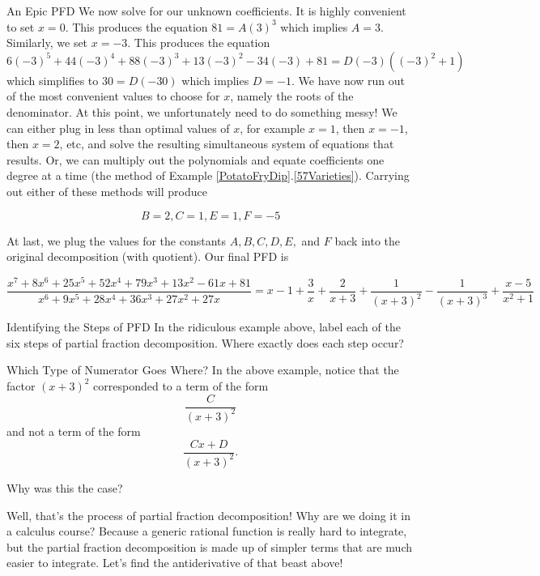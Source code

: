 \begin{example}{An Epic PFD}
We now solve for our unknown coefficients.  It is highly convenient to set $x=0$. This produces the equation $ 81= A (3)^3 $ which implies $A=3$.  Similarly, we set $x=-3$. This produces the equation $$6 (-3)^5+44 (-3)^4+88 (-3)^3+13 (-3)^2-34 (-3)+81=D(-3) ((-3)^2+1)$$ which simplifies to $ 30=D(-30) $ which implies $D=-1$.  We have now run out of the most convenient values to choose for $x$, namely the roots of the denominator.  At this point, we unfortunately need to do something messy!  We can either plug in less than optimal values of $x$, for example $x=1$, then $x=-1$, then $x=2$, etc, and solve the resulting simultaneous system of equations that results.  Or, we can multiply out the polynomials and equate coefficients one degree at a time (the method of Example \ref{PotatoFryDip}.\ref{57Varieties}).  Carrying out either of these methods will produce

$$ B=2, C=1, E=1, F=-5 $$

At last, we plug the values for the constants $A,B,C,D,E,$ and $F$ back into the original decomposition (with quotient).  Our final PFD is 

$$ \frac{x^7+8 x^6+25 x^5+52 x^4+79 x^3+13 x^2-61 x+81}{x^6+9 x^5+28 x^4+36 x^3+27 x^2+27 x} = x-1 + \frac{3}{x} + \frac{2}{x + 3} + \frac{1}{(x + 3)^2} - \frac{1}{(x + 3)^3} + \frac{x - 5}{x^2 + 1} $$ 

\end{example}

\begin{exercise}{ Identifying the Steps of PFD \Coffeecup}
In the ridiculous example above, label each of the six steps of partial fraction decomposition.  Where exactly does each step occur?
\end{exercise}

\begin{exercise}{ Which Type of Numerator Goes Where? \Coffeecup}
In the above example, notice that the factor $(x+3)^2$ corresponded to a term of the form $$\frac{C}{(x+3)^2}$$ and not a term of the form $$\frac{Cx+D}{(x+3)^2}.$$

Why was this the case?

\vspace*{1in}

\end{exercise}

Well, that's the process of partial fraction decomposition!  Why are we doing it in a calculus course?  Because a generic rational function is really hard to integrate, but the partial fraction decomposition is made up of simpler terms that are much easier to integrate.  Let's find the antiderivative of that beast above!  

